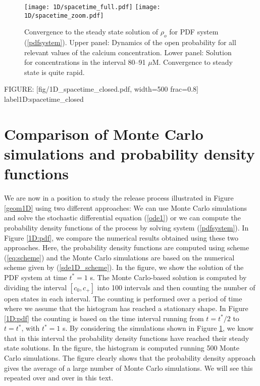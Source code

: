 
\begin{figure}[p]\centering
\vbox{
\texttt{[image: 1D/spacetime\_full.pdf]}
\texttt{[image: 1D/spacetime\_zoom.pdf]}
}
\caption{Convergence to the steady state solution of  $\rho_o$ for PDF system (\ref{pdfsystem}). Upper panel: Dynamics of the open probability for all relevant values of the calcium concentration. Lower panel: Solution for concentrations in the interval  80--91 $\mu$M.  Convergence to steady state is quite rapid. \label{1D/spacetime}}
\end{figure}

FIGURE: [fig/1D_spacetime_closed.pdf, width=500 frac=0.8]  label{1D:spacetime_closed}\section[Comparison of Monte Carlo simulations and PDFs]{Comparison of Monte Carlo simulations and probability density functions}
\label{compare}
We are now in a position to study the release process illustrated in Figure \ref{geom1D} using two different approaches: We can use Monte Carlo simulations and solve the stochastic differential equation (\ref{ode1}) or we can compute the probability density functions of the process by solving system (\ref{pdfsystem}). In Figure \ref{1D:pdf}, we compare the numerical results obtained using these two approaches. Here, the probability density functions are computed using scheme (\ref{eq:scheme}) and the Monte Carlo simulations are based on the numerical scheme given by (\ref{sde1D_scheme}). 
In the figure, we show the solution of the PDF system at time $t^*=1$ s.  The Monte Carlo-based solution is computed by dividing the interval $[c_0,c_+]$ into 100 intervals and then counting the number of open states in each interval. The counting is performed over a period of time where we assume that the histogram has reached a stationary shape. In Figure \ref{1D:pdf}
the counting is based on the time interval running from $t=t^*/2$ to $t=t^*$, with $t^*=1$ s. By considering the simulations shown in Figure \ref{1D/spacetime}, we know that in this interval the probability density functions have reached their steady state solutions.  In the figure, the histogram is computed running 500 Monte Carlo simulations. The figure clearly shows that the probability density approach gives the average of a large number of Monte Carlo simulations. We will see this repeated over and over in this text.

